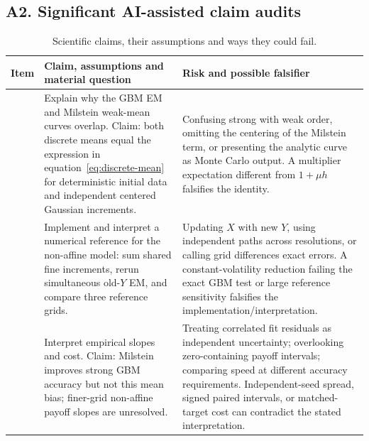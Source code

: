 \subsection*{A2. Significant AI-assisted claim audits}
\begin{table}[H]\centering\small
\caption{Scientific claims, their assumptions and ways they could fail.}\label{tab:ai-audits}
\begin{tabular}{@{}>{\raggedright\arraybackslash}p{.8cm}>{\raggedright\arraybackslash}p{7cm}>{\raggedright\arraybackslash}p{6.8cm}@{}}\toprule
Item & Claim, assumptions and material question & Risk and possible falsifier\\\midrule
1 & Explain why the GBM EM and Milstein weak-mean curves overlap. Claim: both discrete means equal the expression in equation~\eqref{eq:discrete-mean} for deterministic initial data and independent centered Gaussian increments. & Confusing strong with weak order, omitting the centering of the Milstein term, or presenting the analytic curve as Monte Carlo output. A multiplier expectation different from $1+\mu h$ falsifies the identity.\\[2mm]
2 & Implement and interpret a numerical reference for the non-affine model: sum shared fine increments, rerun simultaneous old-$Y$ EM, and compare three reference grids. & Updating $X$ with new $Y$, using independent paths across resolutions, or calling grid differences exact errors. A constant-volatility reduction failing the exact GBM test or large reference sensitivity falsifies the implementation/interpretation.\\[2mm]
3 & Interpret empirical slopes and cost. Claim: Milstein improves strong GBM accuracy but not this mean bias; finer-grid non-affine payoff slopes are unresolved. & Treating correlated fit residuals as independent uncertainty; overlooking zero-containing payoff intervals; comparing speed at different accuracy requirements. Independent-seed spread, signed paired intervals, or matched-target cost can contradict the stated interpretation.\\\bottomrule
\end{tabular}
\end{table}

